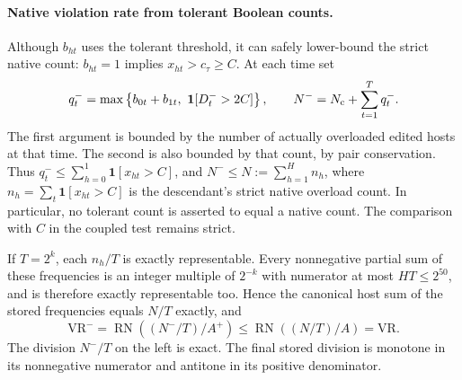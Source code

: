 \documentclass[11pt]{article}
\begin{document}
\paragraph{Native violation rate from tolerant Boolean counts.}
Although $b_{ht}$ uses the tolerant threshold, it can safely lower-bound the strict native count: $b_{ht}=1$ implies $x_{ht}>c_\tau\ge C$. At each time set
\begin{equation}
q_t^-=\max\left\{b_{0t}+b_{1t},\ \mathbf 1[D_t^->2C]\right\},
\qquad N^-=N_{\rm c}+\sum_{t=1}^Tq_t^-.
\label{eq:aggregate-native-count}
\end{equation}
The first argument is bounded by the number of actually overloaded edited hosts at that time. The second is also bounded by that count, by pair conservation. Thus $q_t^-\le\sum_{h=0}^1\mathbf 1[x_{ht}>C]$, and $N^-\le N:=\sum_{h=1}^Hn_h$, where $n_h=\sum_t\mathbf 1[x_{ht}>C]$ is the descendant's strict native overload count. In particular, no tolerant count is asserted to equal a native count. The comparison with $C$ in the coupled test remains strict.

If $T=2^k$, each $n_h/T$ is exactly representable. Every nonnegative partial sum of these frequencies is an integer multiple of $2^{-k}$ with numerator at most $HT\le2^{50}$, and is therefore exactly representable too. Hence the canonical host sum of the stored frequencies equals $N/T$ exactly, and
\begin{equation}
\mathrm{VR}^-=\operatorname{RN}\!\left((N^-/T)/A^+\right)\le\operatorname{RN}\!\left((N/T)/A\right)=\mathrm{VR}.
\label{eq:aggregate-vr-dyadic}
\end{equation}
The division $N^-/T$ on the left is exact. The final stored division is monotone in its nonnegative numerator and antitone in its positive denominator.
\end{document}
